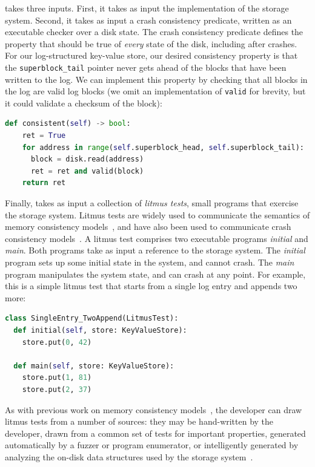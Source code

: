 \depsynth takes three inputs.
First, it takes as input the implementation of the storage system.
Second, it takes as input a crash consistency predicate,
written as an executable checker over a disk state.
The crash consistency predicate
defines the property that should be true of \emph{every} state of the disk, 
including after crashes.
For our log-structured key-value store,
our desired consistency property is that the \texttt{superblock_tail} pointer
never gets ahead of the blocks that have been written to the log.
We can implement this property by checking that all blocks in the log are valid log blocks 
(we omit an implementation of \texttt{valid} for brevity,
but it could validate a checksum of the block):
%
\begin{lstlisting}[language=py]
  def consistent(self) -> bool:
    ret = True
    for address in range(self.superblock_head, self.superblock_tail):
      block = disk.read(address)
      ret = ret and valid(block)
    return ret
\end{lstlisting}
%
Finally, \depsynth takes as input a collection of \emph{litmus tests},
small programs that exercise the storage system.
Litmus tests are widely used to communicate the semantics of memory consistency models~\cite{alglave:litmus-tool,wickerson:memalloy},
and have also been used to communicate crash consistency models~\cite{bornholt:ferrite}.
A \depsynth litmus test comprises two executable programs \emph{initial} and \emph{main}.
Both programs take as input a reference to the storage system.
The \emph{initial} program sets up some initial state in the system, and cannot crash.
The \emph{main} program manipulates the system state, and can crash at any point.
For example, this is a simple litmus test that starts from a single log entry
and appends two more:
%
\begin{lstlisting}[language=py]
class SingleEntry_TwoAppend(LitmusTest):
  def initial(self, store: KeyValueStore):
    store.put(0, 42)
  
  def main(self, store: KeyValueStore):
    store.put(1, 81)
    store.put(2, 37)
\end{lstlisting}
%
As with previous work on memory consistency models~\cite{alglave:litmus-tool,bornholt:memsynth},
the developer can draw litmus tests from a number of sources:
they may be hand-written by the developer,
drawn from a common set of tests for important properties,
generated automatically by a fuzzer or program enumerator,
or intelligently generated by analyzing the on-disk data structures used by the storage system~\cite{alglave:diy}.

